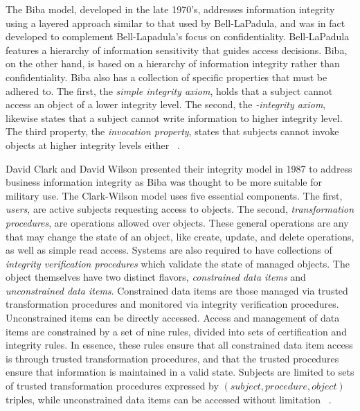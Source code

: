 The Biba model, developed in the late 1970's, addresses information integrity using a layered approach similar to that used by Bell-LaPadula, and was in fact developed to complement Bell-Lapadula's focus on confidentiality.  Bell-LaPadula features a hierarchy of information sensitivity that guides access decisions.  Biba, on the other hand, is based on a hierarchy of information integrity rather than confidentiality.  Biba also has a collection of specific properties that must be adhered to.  The first, the {\it simple integrity axiom}, holds that a subject cannot access an object of a lower integrity level.  The second, the {\it *-integrity axiom}, likewise states that a subject cannot write information to higher integrity level.  The third property, the {\it invocation property}, states that subjects cannot invoke objects at higher integrity levels either ~\cite{Biba1977}.

David Clark and David Wilson presented their integrity model in 1987 to address business information integrity as Biba was thought to be more suitable for military use.  The Clark-Wilson model uses five essential components.  The first, {\it users}, are active subjects requesting access to objects.  The second, {\it transformation procedures}, are operations allowed over objects.  These general operations are any that may change the state of an object, like create, update, and delete operations, as well as simple read access.  Systems are also required to have collections of {\it integrity verification procedures} which validate the state of managed objects.  The object themselves have two distinct flavors, {\it constrained data items} and {\it unconstrained data items}.  Constrained data items are those managed via trusted transformation procedures and monitored via integrity verification procedures.  Unconstrained items can be directly accessed.  Access and management of data items are constrained by a set of nine rules, divided into sets of certification and integrity rules.  In essence, these rules ensure that all constrained data item access is through trusted transformation procedures, and that the trusted procedures ensure that information is maintained in a valid state.  Subjects are limited to sets of trusted transformation procedures expressed by $(subject, procedure, object)$ triples, while unconstrained data items can be accessed without limitation ~\cite{ClaWil87}.





